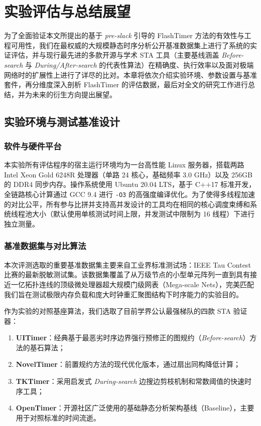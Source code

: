 \chapter{实验评估与总结展望}
\label{chap:experiments}

为了全面验证本文所提出的基于 \textit{pre-slack} 引导的 FlashTimer 方法的有效性与工程可用性，我们在最权威的大规模静态时序分析公开基准数据集上进行了系统的实证评估，并与现行最先进的多款开源与学术 STA 工具（主要基线涵盖 \textit{Before-search} 与 \textit{During/After-search} 的代表性算法）在精确度、执行效率以及面对极端网络时的扩展性上进行了详尽的比对。本章将依次介绍实验环境、参数设置与基准套件，再分维度深入剖析 FlashTimer 的评估数据，最后对全文的研究工作进行总结，并为未来的衍生方向提出展望。

\section{实验环境与测试基准设计}
\label{sec:exp_setup}

\subsection{软件与硬件平台}
本实验所有评估程序的宿主运行环境均为一台高性能 Linux 服务器，搭载两路 Intel Xeon Gold 6248R 处理器（单路 24 核心，基础频率 3.0 GHz）以及 256GB 的 DDR4 同步内存。操作系统使用 Ubuntu 20.04 LTS，基于 C++17 标准开发，全链路核心计算通过 GCC 9.4 进行 \texttt{-O3} 的高强度编译优化。为了使得多线程加速的对比公平，所有参与比拼并支持高并发设计的工具均在相同的核心调度束缚和系统线程池大小（默认使用单核测试时间上限，并发测试中限制为 16 线程）下进行独立测量。

\subsection{基准数据集与对比算法}
本次评测选取的重要基准数据集主要来自工业界标准测试场：IEEE Tau Contest 比赛的最新脱敏测试集。该数据集覆盖了从万级节点的小型单元阵列一直到具有接近一亿拓扑连线的顶级微处理器超大规模门级网表（Mega-scale Nets），完美匹配我们旨在测试极限内存负载和庞大时钟重汇聚图结构下时序能力的实验目的。

作为实验的对照基座算法，我们选取了目前学界公认最强梯队的四款 STA 验证器：
\begin{enumerate}
    \item \textbf{UITimer}\cite{TODO_uitimer}：经典基于最恶劣时序边界强行预修正的图规约（\textit{Before-search}）方法的基石算法；
    \item \textbf{NovelTimer}\cite{TODO_noveltimer}：前置规约方法的现代优化版本，通过扇出同构降低计算；
    \item \textbf{TKTimer}\cite{TODO_tktimer}：采用启发式 \textit{During-search} 边搜边剪枝机制和常数阈值的快速时序工具；
    \item \textbf{OpenTimer}\cite{TODO_opentimer}：开源社区广泛使用的基础静态分析架构基线（Baseline），主要用于对照标准的时间流逝。
\end{enumerate}

